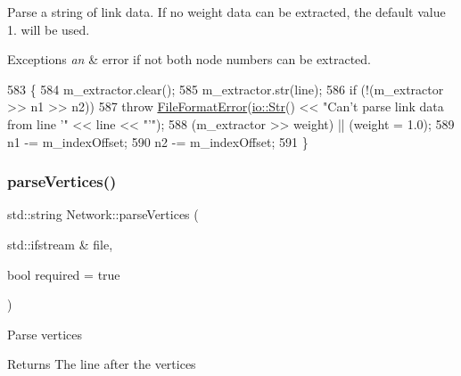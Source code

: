 Parse a string of link data. If no weight data can be extracted, the default value 1. will be used. 
\begin{DoxyExceptions}{Exceptions}
{\em an} & error if not both node numbers can be extracted. \\
\hline
\end{DoxyExceptions}

\begin{DoxyCode}
583 \{
584     m\_extractor.clear();
585     m\_extractor.str(line);
586     \textcolor{keywordflow}{if} (!(m\_extractor >> n1 >> n2))
587         \textcolor{keywordflow}{throw} \mbox{\hyperlink{classFileFormatError}{FileFormatError}}(\mbox{\hyperlink{classio_1_1Str}{io::Str}}() << \textcolor{stringliteral}{"Can't parse link data from line '"} << 
      line << \textcolor{stringliteral}{"'"});
588     (m\_extractor >> weight) || (weight = 1.0);
589     n1 -= m\_indexOffset;
590     n2 -= m\_indexOffset;
591 \}
\end{DoxyCode}
\mbox{\label{classNetwork_a57b99ecccedc6200838163fa3b1ad252}} 
\subsubsection{\texorpdfstring{parse\+Vertices()}{parseVertices()}\hspace{0.1cm}{\footnotesize\ttfamily [1/2]}}
{\footnotesize\ttfamily std\+::string Network\+::parse\+Vertices (\begin{DoxyParamCaption}\item[{std\+::ifstream \&}]{file,  }\item[{bool}]{required = {\ttfamily true} }\end{DoxyParamCaption})\hspace{0.3cm}{\ttfamily [protected]}}

Parse vertices \begin{DoxyReturn}{Returns}
The line after the vertices 
\end{DoxyReturn}


